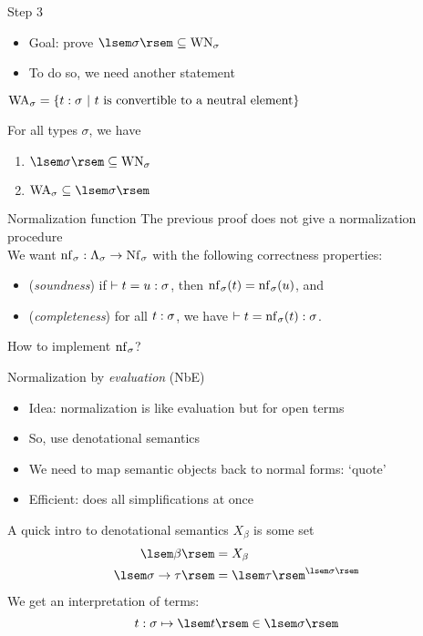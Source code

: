 \documentclass{beamer}
\begin{document}
\begin{frame}{Step 3}
\begin{itemize}
    \item Goal: prove $\sem{\sigma} \subs \mathrm{WN}_\sigma$
    \item To do so, we need another statement
\end{itemize}
$\mathrm{WA}_\sigma = \left\{ t : \sigma \ |\  t\text{ is convertible to a neutral element} \right\}$
\begin{lem}
For all types $\sigma$, we have
\begin{enumerate}
    \item $\sem{\sigma} \subs \mathrm{WN}_\sigma$
    \item $\mathrm{WA}_\sigma \subs \sem{\sigma}$
\end{enumerate}
\end{lem}
\end{frame}

\begin{frame}{Normalization function}
The previous proof does not give a normalization procedure \\
We want $\name{nf}_\sigma : \Tm[\sigma] \to \Nf[\sigma]$ with the following correctness properties:
\begin{itemize}
    \item (\textit{soundness}) if $\vdash t = u : \sigma$, then $\mathrm{nf}_\sigma(t) = \mathrm{nf}_\sigma(u)$, and
    \item (\textit{completeness}) for all $t : \sigma$, we have $\vdash t = \mathrm{nf}_\sigma(t) : \sigma$.
\end{itemize}
\vspace{6pt}
How to implement $\mathrm{nf}_\sigma$?
\end{frame}

\begin{frame}{Normalization by \textit{evaluation} (NbE)}
\begin{itemize}
    \item Idea: normalization is like evaluation but for open terms
    \item So, use denotational semantics
    \item We need to map semantic objects back to normal forms: `quote'
    \item Efficient: does all simplifications at once
\end{itemize}
\end{frame}

\begin{frame}{A quick intro to denotational semantics}
$X_\beta$ is some set
\begin{align*}
    \sem{\beta} &= X_\beta \\
    \sem{\functy{\sigma}{\tau}} &= \funcset{\sem{\sigma}}{\sem{\tau}}
\end{align*}
We get an interpretation of terms:
\[ \typedtm{t}{\sigma} \mapsto \sem{t} \in \sem{\sigma} \]
\end{frame}
\end{document}
